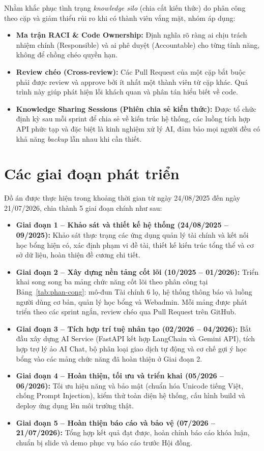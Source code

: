 Nhằm khắc phục tình trạng \textit{knowledge silo} (chia cắt kiến thức) do phân công theo cặp và giảm thiểu rủi ro khi có thành viên vắng mặt, nhóm áp dụng:
\begin{itemize}
    \item \textbf{Ma trận RACI \& Code Ownership:} Định nghĩa rõ ràng ai chịu trách nhiệm chính (Responsible) và ai phê duyệt (Accountable) cho từng tính năng, không để chồng chéo quyền hạn.
    \item \textbf{Review chéo (Cross-review):} Các Pull Request của một cặp bắt buộc phải được review và approve bởi ít nhất một thành viên từ cặp khác. Quá trình này giúp phát hiện lỗi khách quan và phân tán hiểu biết về code.
    \item \textbf{Knowledge Sharing Sessions (Phiên chia sẻ kiến thức):} Được tổ chức định kỳ sau mỗi sprint để chia sẻ về kiến trúc hệ thống, các luồng tích hợp API phức tạp và đặc biệt là kinh nghiệm xử lý AI, đảm bảo mọi người đều có khả năng \textit{backup} lẫn nhau khi cần thiết.
\end{itemize}

\section{Các giai đoạn phát triển}
Đồ án được thực hiện trong khoảng thời gian từ ngày 24/08/2025 đến ngày 21/07/2026, chia thành 5 giai đoạn chính như sau:
\begin{itemize}
    \item \textbf{Giai đoạn 1 -- Khảo sát và thiết kế hệ thống (24/08/2025 -- 09/2025):} Khảo sát thực trạng các ứng dụng quản lý tài chính và kết nối học bổng hiện có, xác định phạm vi đề tài, thiết kế kiến trúc tổng thể và cơ sở dữ liệu, hoàn thiện đề cương chi tiết.
    \item \textbf{Giai đoạn 2 -- Xây dựng nền tảng cốt lõi (10/2025 -- 01/2026):} Triển khai song song ba mảng chức năng cốt lõi theo phân công tại Bảng~\ref{tab:phan-cong}: mô-đun Tài chính 6 lọ, hệ thống thông báo và luồng người dùng cơ bản, quản lý học bổng và Webadmin. Mỗi mảng được phát triển theo các sprint ngắn, review chéo qua Pull Request trên GitHub.
    \item \textbf{Giai đoạn 3 -- Tích hợp trí tuệ nhân tạo (02/2026 -- 04/2026):} Bắt đầu xây dựng AI Service (FastAPI kết hợp LangChain và Gemini API), tích hợp trợ lý ảo AI Chat, bộ phân loại giao dịch tự động và cơ chế gợi ý học bổng vào các mảng chức năng đã hoàn thiện ở Giai đoạn 2.
    \item \textbf{Giai đoạn 4 -- Hoàn thiện, tối ưu và triển khai (05/2026 -- 06/2026):} Tối ưu hiệu năng và bảo mật (chuẩn hóa Unicode tiếng Việt, chống Prompt Injection), kiểm thử toàn diện hệ thống, cấu hình build và deploy ứng dụng lên môi trường thật.
    \item \textbf{Giai đoạn 5 -- Hoàn thiện báo cáo và bảo vệ (07/2026 -- 21/07/2026):} Tổng hợp kết quả đạt được, hoàn chỉnh báo cáo khóa luận, chuẩn bị slide và demo phục vụ báo cáo trước Hội đồng.
\end{itemize}


